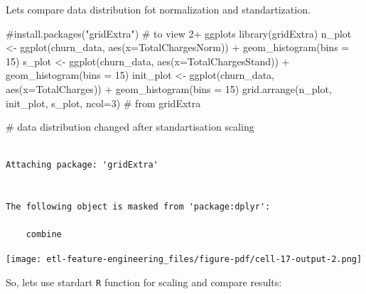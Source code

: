 \documentclass[
  letterpaper,
  DIV=11,
  numbers=noendperiod]{scrreprt}
\newenvironment{Shaded}{\begin{snugshade}}{\end{snugshade}}
\newcommand{\AttributeTok}[1]{\textcolor[rgb]{0.40,0.45,0.13}{#1}}
\newcommand{\CommentTok}[1]{\textcolor[rgb]{0.37,0.37,0.37}{#1}}
\newcommand{\DecValTok}[1]{\textcolor[rgb]{0.68,0.00,0.00}{#1}}
\newcommand{\FunctionTok}[1]{\textcolor[rgb]{0.28,0.35,0.67}{#1}}
\newcommand{\NormalTok}[1]{\textcolor[rgb]{0.00,0.23,0.31}{#1}}
\newcommand{\OtherTok}[1]{\textcolor[rgb]{0.00,0.23,0.31}{#1}}
\newcommand{\SpecialCharTok}[1]{\textcolor[rgb]{0.37,0.37,0.37}{#1}}
\begin{document}
Lets compare data distribution fot normalization and standartization.

\begin{Shaded}
\begin{Highlighting}[]
\CommentTok{\#install.packages("gridExtra") \# to view 2+ ggplots }
\FunctionTok{library}\NormalTok{(gridExtra)}
\NormalTok{n\_plot }\OtherTok{\textless{}{-}} \FunctionTok{ggplot}\NormalTok{(churn\_data, }\FunctionTok{aes}\NormalTok{(}\AttributeTok{x=}\NormalTok{TotalChargesNorm)) }\SpecialCharTok{+} \FunctionTok{geom\_histogram}\NormalTok{(}\AttributeTok{bins =} \DecValTok{15}\NormalTok{)}
\NormalTok{s\_plot }\OtherTok{\textless{}{-}} \FunctionTok{ggplot}\NormalTok{(churn\_data, }\FunctionTok{aes}\NormalTok{(}\AttributeTok{x=}\NormalTok{TotalChargesStand)) }\SpecialCharTok{+} \FunctionTok{geom\_histogram}\NormalTok{(}\AttributeTok{bins =} \DecValTok{15}\NormalTok{)}
\NormalTok{init\_plot }\OtherTok{\textless{}{-}} \FunctionTok{ggplot}\NormalTok{(churn\_data, }\FunctionTok{aes}\NormalTok{(}\AttributeTok{x=}\NormalTok{TotalCharges)) }\SpecialCharTok{+} \FunctionTok{geom\_histogram}\NormalTok{(}\AttributeTok{bins =} \DecValTok{15}\NormalTok{)}
\FunctionTok{grid.arrange}\NormalTok{(n\_plot, init\_plot, s\_plot, }\AttributeTok{ncol=}\DecValTok{3}\NormalTok{) }\CommentTok{\# from gridExtra}

\CommentTok{\# data distribution changed after standartisation scaling}
\end{Highlighting}
\end{Shaded}

\begin{verbatim}

Attaching package: 'gridExtra'


The following object is masked from 'package:dplyr':

    combine

\end{verbatim}

\texttt{[image: etl-feature-engineering\_files/figure-pdf/cell-17-output-2.png]}

So, lets use stardart \texttt{R} function for scaling and compare
results:
\end{document}
